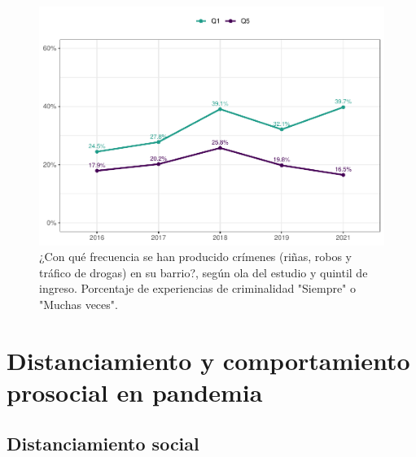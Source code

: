 \documentclass[
  12pt,
  openany]{book}
\begin{document}
\begin{figure}

{\centering \includegraphics{reporte-elsoc_files/figure-latex/crim-quintil-1} 

}

\caption{¿Con qué frecuencia se han producido crímenes (riñas, robos y tráfico de drogas) en su barrio?, según ola del estudio y quintil de ingreso. Porcentaje de experiencias de criminalidad "Siempre" o "Muchas veces".}\label{fig:crim-quintil}
\end{figure}

\hypertarget{distanciamiento-y-comportamiento-prosocial-en-pandemia}{%
\section{Distanciamiento y comportamiento prosocial en pandemia}\label{distanciamiento-y-comportamiento-prosocial-en-pandemia}}

\hypertarget{distanciamiento-social}{%
\subsection{Distanciamiento social}\label{distanciamiento-social}}
\end{document}
